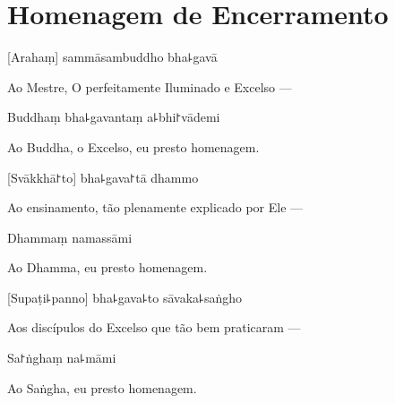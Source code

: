 \clearpage

\chapter{Homenagem de Encerramento}

[Arahaṃ] sammāsambuddho bha꜕gavā

\begin{english}
  Ao Mestre, O perfeitamente Iluminado e Excelso ---
\end{english}

Buddhaṃ bha꜕gavantaṃ a꜕bhi꜓vādemi

\begin{english}
  Ao Buddha, o Excelso, eu presto homenagem.
\end{english}

[Svākkhā꜓to] bha꜕gava꜓tā dhammo

\begin{english}
  Ao ensinamento, tão plenamente explicado por Ele ---
\end{english}

Dhammaṃ namassāmi

\begin{english}
  Ao Dhamma, eu presto homenagem.
\end{english}


[Supaṭi꜕panno] bha꜕gava꜕to sāvaka꜕saṅgho

\begin{english}
  Aos discípulos do Excelso que tão bem praticaram ---
\end{english}

Sa꜓ṅghaṃ na꜕māmi

\begin{english}
  Ao Saṅgha, eu presto homenagem.
\end{english}
